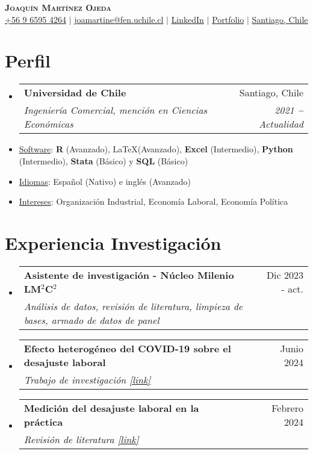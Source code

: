 \documentclass[letterpaper,12pt]{article}
\makeatletter
\newcommand{\resumeSubheading}[4]{
  \vspace{-1pt}\item
    \begin{tabular*}{0.97\textwidth}{l@{\extracolsep{\fill}}r}
      \textbf{#1} & #2 \\
      \textit{\small#3} & \textit{\small #4} \\
    \end{tabular*}\vspace{-5pt}
}
\newcommand{\resumeSubHeadingListStart}{\begin{itemize}[leftmargin=*]}
\newcommand{\resumeSubHeadingListEnd}{\end{itemize}}
\makeatother
\begin{document}
\begin{center}
    \textbf{\Huge \scshape Joaquín Martínez Ojeda} \\ \vspace{3pt}
    \small
    \faMobile \hspace{.5pt} \href{tel:56965954264}{+56 9 6595 4264}
    $|$
    \faAt \hspace{.5pt} \href{mailto:joamartine@fen.uchile.cl}{joamartine@fen.uchile.cl}
    $|$
    \faLinkedinSquare \hspace{.5pt} \href{https://www.linkedin.com/in/joaquinmartinezojeda}{LinkedIn}
    $|$
    \faGlobe \hspace{.5pt} \href{https://joamartine.github.io}{Portfolio}
    $|$
    \faMapMarker \hspace{.5pt} \href{https://maps.app.goo.gl/cbbvVAk5rXpZFVti9}{Santiago, Chile}
\end{center}

\section{Perfil}
\resumeSubHeadingListStart
    \resumeSubheading
      {Universidad de Chile
      }{Santiago, Chile}
      {Ingeniería Comercial, mención en Ciencias Económicas}{2021 \textbf{--} Actualidad}
  \resumeSubHeadingListEnd
  \begin{itemize}
      \item \underline{Software}: \textbf{R} (Avanzado), \LaTeX (Avanzado), \textbf{Excel} (Intermedio), \textbf{Python} (Intermedio), \textbf{Stata} (Básico) y \textbf{SQL }(Básico)
      \item \underline{Idiomas}: Español (Nativo) e inglés (Avanzado)
      \item \underline{Intereses}: Organización Industrial, Economía Laboral, Economía Política
  \end{itemize}


\section{Experiencia Investigación}
  \resumeSubHeadingListStart
     \resumeSubheading
      {Asistente de investigación - Núcleo Milenio LM$^\text{2}$C$^\text{2}$}{Dic 2023 - act.}
      {Análisis de datos, revisión de literatura, limpieza de bases, armado de datos de panel}{}
    \resumeSubheading
      {Efecto heterogéneo del COVID-19 sobre el desajuste laboral}{Junio 2024}
      {Trabajo de investigación \href{https://drive.google.com/file/d/1D6_w-8GlvZBQXEskPFQFcdcIt8ngx4ss/view?usp=sharing}{[\underline{link}]}}{}
    \resumeSubheading
      {Medición del desajuste laboral en la práctica}{Febrero 2024}
      {Revisión de literatura \href{https://drive.google.com/file/d/1bl-FirA7blKewJaxllg9GCRgCwHU3hKS/view?usp=sharing}{[\underline{link}]}}{}
    \resumeSubHeadingListEnd
\end{document}
